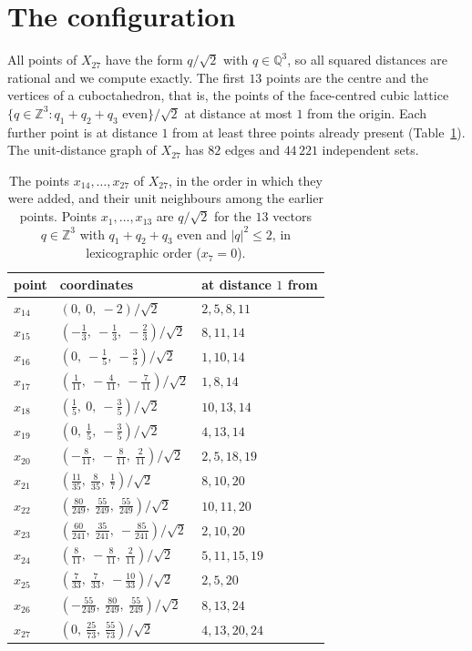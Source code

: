 \documentclass[11pt,a4paper]{amsart}
\theoremstyle{remark}
\newcommand{\Q}{\mathbb{Q}}
\newcommand{\Z}{\mathbb{Z}}
\newcommand{\NPTS}{27}
\newcommand{\NUNIT}{82}
\newcommand{\NATOMS}{44\,221}
\begin{document}
\section{The configuration}\label{sec:config}

All points of $X_{\NPTS}$ have the form $q/\sqrt2$ with $q\in\Q^3$, so all squared distances are rational and we compute
exactly. The first $13$ points are the centre and the vertices of a cuboctahedron, that is, the points of the
face-centred cubic lattice $\{q\in\Z^3:q_1+q_2+q_3\text{ even}\}/\sqrt2$ at distance at most $1$ from the origin. Each
further point is at distance $1$ from at least three points already present (Table~\ref{tab:pts}). The unit-distance
graph of $X_{\NPTS}$ has $\NUNIT$ edges and $\NATOMS$ independent sets.

\begin{table}[ht]
\centering
\small
\begin{tabular}{lll}
\toprule
point & coordinates & at distance $1$ from\\
\midrule
$x_{14}$ & $(0,\ 0,\ -2)/\sqrt2$ & $2, 5, 8, 11$\\
$x_{15}$ & $(-\tfrac{1}{3},\ -\tfrac{1}{3},\ -\tfrac{2}{3})/\sqrt2$ & $8, 11, 14$\\
$x_{16}$ & $(0,\ -\tfrac{1}{5},\ -\tfrac{3}{5})/\sqrt2$ & $1, 10, 14$\\
$x_{17}$ & $(\tfrac{1}{11},\ -\tfrac{4}{11},\ -\tfrac{7}{11})/\sqrt2$ & $1, 8, 14$\\
$x_{18}$ & $(\tfrac{1}{5},\ 0,\ -\tfrac{3}{5})/\sqrt2$ & $10, 13, 14$\\
$x_{19}$ & $(0,\ \tfrac{1}{5},\ -\tfrac{3}{5})/\sqrt2$ & $4, 13, 14$\\
$x_{20}$ & $(-\tfrac{8}{11},\ -\tfrac{8}{11},\ \tfrac{2}{11})/\sqrt2$ & $2, 5, 18, 19$\\
$x_{21}$ & $(\tfrac{11}{35},\ \tfrac{8}{35},\ \tfrac{1}{7})/\sqrt2$ & $8, 10, 20$\\
$x_{22}$ & $(\tfrac{80}{249},\ \tfrac{55}{249},\ \tfrac{55}{249})/\sqrt2$ & $10, 11, 20$\\
$x_{23}$ & $(\tfrac{60}{241},\ \tfrac{35}{241},\ -\tfrac{85}{241})/\sqrt2$ & $2, 10, 20$\\
$x_{24}$ & $(\tfrac{8}{11},\ -\tfrac{8}{11},\ \tfrac{2}{11})/\sqrt2$ & $5, 11, 15, 19$\\
$x_{25}$ & $(\tfrac{7}{33},\ \tfrac{7}{33},\ -\tfrac{10}{33})/\sqrt2$ & $2, 5, 20$\\
$x_{26}$ & $(-\tfrac{55}{249},\ \tfrac{80}{249},\ \tfrac{55}{249})/\sqrt2$ & $8, 13, 24$\\
$x_{27}$ & $(0,\ \tfrac{25}{73},\ \tfrac{55}{73})/\sqrt2$ & $4, 13, 20, 24$\\
\bottomrule
\end{tabular}
\caption{The points $x_{14},\dots,x_{27}$ of $X_{27}$, in the order in which they were added, and their unit neighbours among the earlier points. Points $x_1,\dots,x_{13}$ are $q/\sqrt2$ for the $13$ vectors $q\in\Z^3$ with $q_1+q_2+q_3$ even and $|q|^2\le2$, in lexicographic order ($x_7=0$).}\label{tab:pts}
\end{table}
\end{document}
